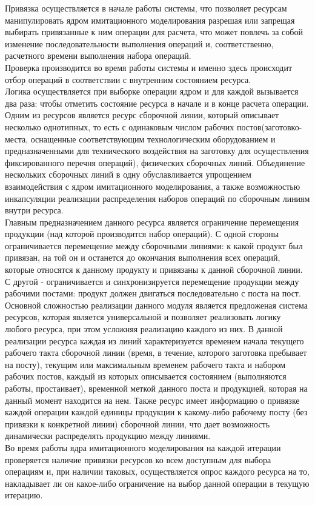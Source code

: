 \indent Привязка осуществляется в начале работы системы, что позволяет ресурсам манипулировать ядром имитационного моделирования разрешая или запрещая выбирать привязанные к ним операции для расчета, что может повлечь за собой изменение последовательности выполнения операций и, соответственно, расчетного времени выполнения набора операций.\\
\indent Проверка производится во время работы системы и именно здесь происходит отбор операций в соответствии с внутренним состоянием ресурса.\\
\indent Логика осуществляется при выборке операции ядром и для каждой вызывается два раза: чтобы отметить состояние ресурса в начале и в конце расчета операции.\\
\indent Одним из ресурсов является ресурс сборочной линии, который описывает несколько однотипных, то есть с одинаковым числом рабочих постов(заготовко-места, оснащенные соответствующим технологическим оборудованием и предназначенными для технического воздействия на заготовку для осуществления фиксированного перечня операций), физических сборочных линий.
Объединение нескольких сборочных линий в одну обуславливается упрощением взаимодействия с ядром имитационного моделирования, а также возможностью инкапсуляции реализации распределения наборов операций по сборочным линиям внутри ресурса.\\
\indent Главным предназначением данного ресурса является ограничение перемещения продукции (над которой производится набор операций).
С одной стороны ограничивается перемещение между сборочными линиями: к какой продукт был привязан, на той он и останется до окончания выполнения всех операций, которые относятся к данному продукту и привязаны к данной сборочной линии.
С другой - ограничивается и синхронизируется перемещение продукции между рабочими постами: продукт должен двигаться последовательно с поста на пост.\\
\indent Основной сложностью реализации данного модуля является предложеная система ресурсов, которая является универсальной и позволяет реализовать логику любого ресурса, при этом усложняя реализацию каждого из них.
В данной реализации ресурса каждая из линий характеризуется временем начала текущего рабочего такта сборочной линии (время, в течение, которого заготовка пребывает на посту), текущим или максимальным временем рабочего такта и набором рабочих постов, каждый из которых описывается состоянием (выполняются работы, простаивает), временной меткой данного поста и продукцией, которая на данный момент находится на нем.
Также ресурс имеет информацию о привязке каждой операции каждой единицы продукции к какому-либо рабочему посту (без привязки к конкретной линии) сборочной линии, что дает возможность динамически распределять продукцию между линиями.\\
\indent Во время работы ядра имитационного моделирования на каждой итерации проверяется наличие привязки ресурсов ко всем доступным для выбора операциям и, при наличии таковых, осуществляется опрос каждого ресурса на то, накладывает ли он какое-либо ограничение на выбор данной операции в текущую итерацию.

